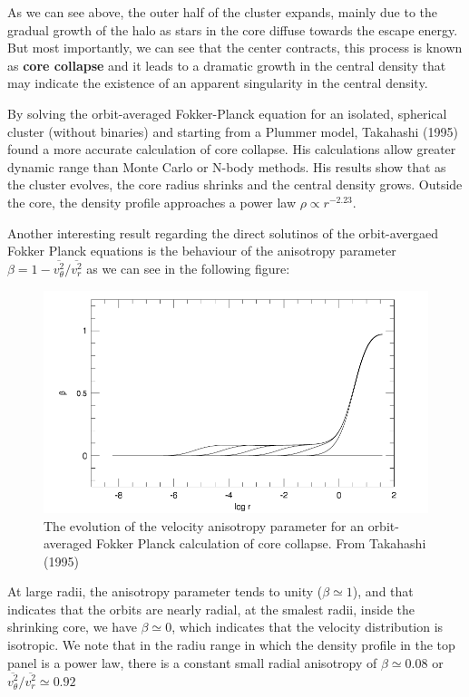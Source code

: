 As we can see above, the outer half of the cluster expands, mainly due to the gradual growth of the halo as stars in the core diffuse towards the escape energy. But most importantly, we can see that the center contracts, this process is known as \textbf{core collapse} and it leads to a dramatic growth in the central density that may indicate the existence of an apparent singularity in the central density.

By solving the orbit-averaged Fokker-Planck equation for an isolated, spherical cluster (without binaries) and starting from a Plummer model, Takahashi (1995) found a more accurate calculation of core collapse. His calculations allow greater dynamic range than Monte Carlo or N-body methods. His results show that as the cluster evolves, the core radius shrinks  and the central density grows. Outside the core, the density profile approaches a power law $\rho\varpropto r^{-2.23}$.

Another interesting result regarding the direct solutinos of the orbit-avergaed Fokker Planck equations is the behaviour of the anisotropy parameter $\beta=1-\overline{v_{\theta}^{2}}/\overline{v_{r}^{2}}$ as we can see in the following figure:

\begin{figure}[H]
\centering
\includegraphics[width=12cm]{images/anisotropy_core_collapse.png}
\caption[Evolution of the velocity anisotropy parameter]{The evolution of the velocity anisotropy parameter for an orbit-averaged Fokker Planck calculation of core collapse. From Takahashi (1995)}
\end{figure}

At large radii, the anisotropy parameter tends to unity ($\beta\simeq1$), and that indicates that the orbits are nearly radial, at the smalest radii, inside the shrinking core, we have $\beta\simeq0$, which indicates that the velocity distribution is isotropic. We note that in the radiu range in which the density profile in the top panel is a power law, there is a constant small radial anisotropy of $\beta\simeq0.08$ or  $\overline{v_{\theta}^{2}}/\overline{v_{r}^{2}}\simeq0.92$





